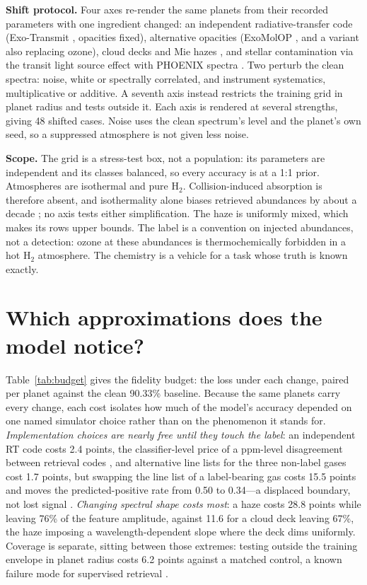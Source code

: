 \documentclass{article}
\begin{document}
\textbf{Shift protocol.} Four axes re-render the same planets from their recorded parameters with one ingredient changed: an independent radiative-transfer code (Exo-Transmit \citep{kempton2017}, opacities fixed), alternative opacities (ExoMolOP \citep{chubb2021}, and a variant also replacing ozone), cloud decks and Mie hazes \citep{lee2013}, and stellar contamination via the transit light source effect \citep{rackham2018} with PHOENIX spectra \citep{allard2012}. Two perturb the clean spectra: noise, white or spectrally correlated, and instrument systematics, multiplicative or additive. A seventh axis instead restricts the training grid in planet radius and tests outside it. Each axis is rendered at several strengths, giving 48 shifted cases. Noise uses the clean spectrum's level and the planet's own seed, so a suppressed atmosphere is not given less noise.

\textbf{Scope.} The grid is a stress-test box, not a population: its parameters are independent and its classes balanced, so every accuracy is at a 1:1 prior. Atmospheres are isothermal and pure H$_2$. Collision-induced absorption is therefore absent, and isothermality alone biases retrieved abundances by about a decade \citep{rocchetto2016}; no axis tests either simplification. The haze is uniformly mixed, which makes its rows upper bounds. The label is a convention on injected abundances, not a detection: ozone at these abundances is thermochemically forbidden in a hot H$_2$ atmosphere. The chemistry is a vehicle for a task whose truth is known exactly.

\section{Which approximations does the model notice?}

Table~\ref{tab:budget} gives the fidelity budget: the loss under each change, paired per planet against the clean 90.33\% baseline. Because the same planets carry every change, each cost isolates how much of the model's accuracy depended on one named simulator choice rather than on the phenomenon it stands for. \emph{Implementation choices are nearly free until they touch the label}: an independent RT code costs 2.4 points, the classifier-level price of a ppm-level disagreement between retrieval codes \citep{barstow2020}, and alternative line lists for the three non-label gases cost 1.7 points, but swapping the line list of a label-bearing gas costs 15.5 points and moves the predicted-positive rate from 0.50 to 0.34---a displaced boundary, not lost signal \citep{niraula2022}. \emph{Changing spectral shape costs most}: a haze costs 28.8 points while leaving 76\% of the feature amplitude, against 11.6 for a cloud deck leaving 67\%, the haze imposing a wavelength-dependent slope where the deck dims uniformly. Coverage is separate, sitting between those extremes: testing outside the training envelope in planet radius costs 6.2 points against a matched control, a known failure mode for supervised retrieval \citep{nixon2020}.
\end{document}
